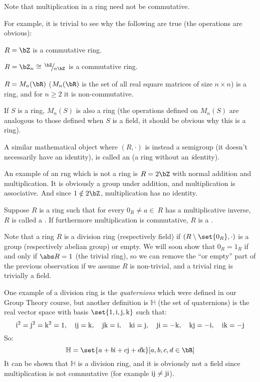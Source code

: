 \documentclass[10pt]{article}
\def\slfrac#1#2{\left.{}^{#1}\mkern-4mu\middle/\mkern-3mu{}_{#2}\right.}
\begin{document}
Note that multiplication in a ring need not be commutative.

For example, it is trivial to see why the following are true (the operations are obvious):
\benum
    \item $R=\bZ$ is a commutative ring.
    \item $R=\bZ_n\cong\slfrac\bZ{n\bZ}$ is a commutative ring.
    \item $R=M_n(\bR)$ ($M_n(\bR)$ is the set of all real square matrices of size $n\times n$) is a ring, and for $n\geq2$ it is non-commutative.
    \item If $S$ is a ring, $M_n(S)$ is also a ring (the operations defined on $M_n(S)$ are analogous to those defined when $S$ is a field, it should be obvious why this is a ring).
\eenum

\begin{defn*}

    A similar mathematical object where $(R,\cdot)$ is instead a semigroup (it doesn't necessarily have an identity), is called an  (a ring without an \textit{i}dentity).

\end{defn*}

An example of an rng which is not a ring is $R=2\bZ$ with normal addition and multiplication.
It is obviously a group under addition, and multiplication is associative.
And since $1\notin2\bZ$, multiplication has no identity.

\begin{defn*}

    Suppose $R$ is a ring such that for every $0_R\neq a\in\ R$ has a multiplicative inverse, $R$ is called a .
    If furthermore multiplication is commutative, $R$ is a .

\end{defn*}

Note that a ring $R$ is a division ring (respectively field) if $(R\setminus\set{0_R},\cdot)$ is a group (respectively abelian group) or empty.
We will soon show that $0_R=1_R$ if and only if $\abs R=1$ (the trivial ring), so we can remove the ``or empty'' part of the previous observation if we assume $R$ is non-trivial, and a trivial ring is
trivially a field.

\def\qi{{\rm i}} \def\qj{{\rm j}} \def\qk{{\rm k}} \def\bH{\mathbb{H}}
One example of a division ring is the \emph{quaternions} which were defined in our Group Theory course, but another definition is $\bH$ (the set of quaternions) is the real vector space with basis
$\set{1, \qi, \qj, \qk}$ such that:
\[ \qi^2 = \qj^2 = \qk^2 = 1,\quad \qi\qj = \qk,\quad \qj\qk=\qi,\quad \qk\qi=\qj,\quad \qj\qi=-\qk,\quad \qk\qj=-\qi,\quad \qi\qk=-\qj \]
So:
\[ \bH = \set{a+b\qi+c\qj+d\qk}[a,b,c,d\in\bR] \]
It can be shown that $\bH$ is a division ring, and it is obviously not a field since multiplication is not commutative (for example $\qi\qj\neq\qj\qi$).
\end{document}
